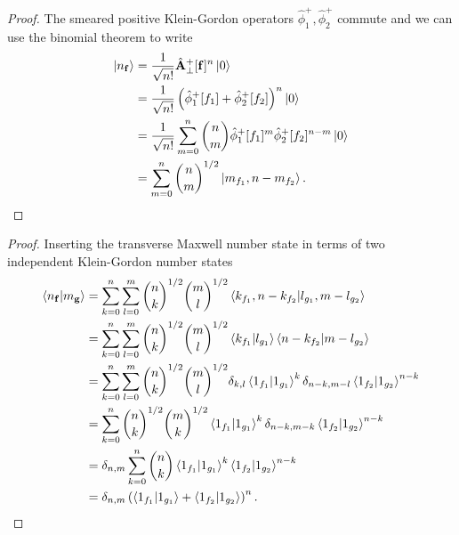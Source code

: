 \qmwqkgnumberstate
\begin{proof}
	The smeared positive Klein-Gordon operators $\hat\phi^+_1,\hat\phi^+_2$ commute and we can use the binomial theorem to write
	\begin{equation*}
		\begin{split}
			\ket{n_{\vb{f}}}
			&=
			\frac{1}{\sqrt{n!}}
			\hat{\vb{A}}_\perp^+[\vb{f}]^n
			\ket{0}
			\\
			&=
			\frac{1}{\sqrt{n!}}
			\left(
				\hat\phi_1^+[f_1]
				+
				\hat\phi_2^+[f_2]
			\right)^n
			\ket{0}
			\\
			&=
			\frac{1}{\sqrt{n!}}
			\sum^n_{m=0}
			\binom{n}{m}
			\hat\phi_1^+[f_1]^m
			\hat\phi_2^+[f_2]^{n-m}
			\ket{0}
			\\
			&=
			\sum^n_{m=0}
			\binom{n}{m}^{1/2}
			\ket{m_{f_1},n-m_{f_2}}
			.
		\end{split}
	\end{equation*}
\end{proof}
\qmwqkgnumberstateinnerproduct
\begin{proof}
	Inserting the transverse Maxwell number state in terms of two independent Klein-Gordon number states 
	\begin{equation*}
		\begin{split}
			\braket{n_{\vb{f}}}{m_{\vb{g}}}
			&=
			\sum^n_{k=0}
			\sum^m_{l=0}
			\binom{n}{k}^{1/2}
			\binom{m}{l}^{1/2}
			\braket{k_{f_1},n-k_{f_2}}{l_{g_1},m-l_{g_2}}
			\\
			&=
			\sum^n_{k=0}
			\sum^m_{l=0}
			\binom{n}{k}^{1/2}
			\binom{m}{l}^{1/2}
			\braket{k_{f_1}}{l_{g_1}}
			\braket{n-k_{f_2}}{m-l_{g_2}}
			\\
			&=
			\sum^n_{k=0}
			\sum^m_{l=0}
			\binom{n}{k}^{1/2}
			\binom{m}{l}^{1/2}
			\delta_{k,l}
			\braket{1_{f_1}}{1_{g_1}}^k
			\delta_{n-k,m-l}
			\braket{1_{f_2}}{1_{g_2}}^{n-k}
			\\
			&=
			\sum^n_{k=0}
			\binom{n}{k}^{1/2}
			\binom{m}{k}^{1/2}
			\braket{1_{f_1}}{1_{g_1}}^k
			\delta_{n-k,m-k}
			\braket{1_{f_2}}{1_{g_2}}^{n-k}
			\\
			&=
			\delta_{n,m}
			\sum^n_{k=0}
			\binom{n}{k}
			\braket{1_{f_1}}{1_{g_1}}^k
			\braket{1_{f_2}}{1_{g_2}}^{n-k}
			\\
			&=
			\delta_{n,m}
			\left(
				\braket{1_{f_1}}{1_{g_1}}
				+
				\braket{1_{f_2}}{1_{g_2}}
			\right)^n
			.
		\end{split}
	\end{equation*}
\end{proof}
